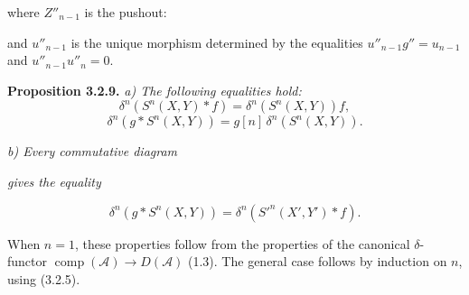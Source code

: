 \clearpage
{}%
\begingroup\small\setlength{\parskip}{0pt}\setlength{\emergencystretch}{1.5em}
\setlength{\abovedisplayskip}{4pt plus 2pt minus 2pt}%
\setlength{\belowdisplayskip}{4pt plus 2pt minus 2pt}%

where $Z''_{n-1}$ is the pushout:

\begin{center}
\end{center}
and $u''_{n-1}$ is the unique morphism determined by the equalities
$u''_{n-1}g''=u_{n-1}$ and $u''_{n-1}u''_n=0$.

\medskip\noindent\textbf{Proposition 3.2.9.}\quad
\textit{a) The following equalities hold:}
\[
\delta^n(S^n(X,Y)*f)=\delta^n(S^n(X,Y))f,
\]
\[
\delta^n(g*S^n(X,Y))=g[n]\,\delta^n(S^n(X,Y)).
\]

\noindent\textit{b) Every commutative diagram}
\begin{center}
\end{center}
\noindent\textit{gives the equality}

\begin{equation}
\delta^n(g*S^n(X,Y))=\delta^n({S'}^n(X',Y')*f).
\tag{3.2.9.1}
\end{equation}

When $n=1$, these properties follow from the properties of the canonical
$\delta$-functor
$\operatorname{comp}(\mathcal A)\longrightarrow D(\mathcal A)$ (1.3).
The general case follows by induction on $n$, using (3.2.5).


